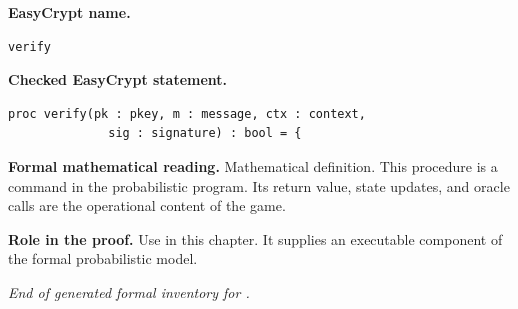 \begin{formaldefinition}
\noindent\textbf{EasyCrypt name.}
\begin{lstlisting}[language=EasyCrypt,basicstyle=\ttfamily\scriptsize]
verify
\end{lstlisting}
\noindent\textbf{Checked EasyCrypt statement.}
\begin{lstlisting}[language=EasyCrypt,basicstyle=\ttfamily\scriptsize]
proc verify(pk : pkey, m : message, ctx : context,
              sig : signature) : bool = {
\end{lstlisting}
\noindent\textbf{Formal mathematical reading.}
Mathematical definition. This procedure is a command in the probabilistic program.  Its return value, state updates, and oracle calls are the operational content of the game.

\noindent\textbf{Role in the proof.}
Use in this chapter. It supplies an executable component of the formal probabilistic model.

\end{formaldefinition}

\medskip
\noindent\emph{End of generated formal inventory for .}
